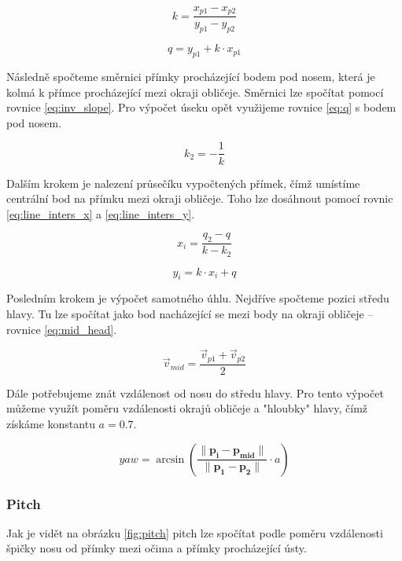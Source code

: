 \documentclass[12pt,a4paper,titlepage,final]{report}
\begin{document}
\begin{equation}\label{eq:slope}
k = \frac{x_{p1} - x_{p2}}{y_{p1} - y_{p2}} 
\end{equation}

\begin{equation}\label{eq:q}
q = y_{p1} + k \cdot x_{p1}
\end{equation}

Následně spočteme směrnici přímky procházející bodem pod nosem, která je kolmá k přímce procházející mezi okraji obličeje. Směrnici lze spočítat pomocí rovnice \ref{eq:inv_slope}. Pro výpočet úseku opět využijeme rovnice \ref{eq:q} s bodem pod nosem.

\begin{equation}\label{eq:inv_slope}
k_2 = -\frac{1}{k}
\end{equation}

Dalším krokem je nalezení průsečíku vypočtených přímek, čímž umístíme centrální bod na přímku mezi okraji obličeje. Toho lze dosáhnout pomocí rovnic \ref{eq:line_inters_x} a \ref{eq:line_inters_y}.

\begin{equation}\label{eq:line_inters_x}
x_i = \frac{q_2 - q}{k - k_2}
\end{equation}

\begin{equation}\label{eq:line_inters_y}
y_i = k \cdot x_i + q
\end{equation}

Posledním krokem je výpočet samotného úhlu. Nejdříve spočteme pozici středu hlavy. Tu lze spočítat jako bod nacházející se mezi body na okraji obličeje -- rovnice \ref{eq:mid_head}. 

\begin{equation}\label{eq:mid_head}
\vec{v}_{mid} = \frac{\vec{v}_{p1} + \vec{v}_{p2}}{2}
\end{equation}

Dále potřebujeme znát vzdálenost od nosu do středu hlavy. Pro tento výpočet můžeme využít poměru vzdálenosti okrajů obličeje a "hloubky" hlavy, čímž získáme konstantu $a = 0.7$.
 
\begin{equation}\label{eq:geom_yaw}
yaw = \arcsin{(\frac{\lVert \mathbf{p_i - p_{mid}} \rVert}{\lVert \mathbf{p_1 - p_2} \rVert} \cdot a)}
\end{equation}

\subsubsection{Pitch}
Jak je vidět na obrázku \ref{fig:pitch} pitch lze spočítat podle poměru vzdálenosti špičky nosu od přímky mezi očima a přímky procházející ústy.
\end{document}
